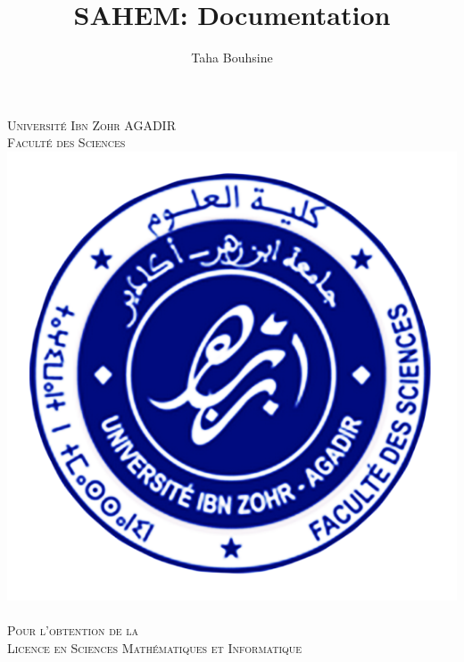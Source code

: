 \documentclass[11pt, openany]{report}
\begin{document}
\title{SAHEM: Documentation  }
\author{Taha Bouhsine}
\date{}


\thispagestyle{empty}
\renewcommand{\chaptermark}[1]{\markboth{\chaptername\ \thechapter. #1}{}}
\renewcommand{\sectionmark}[1]{\markright{\thesection. #1}}


\makeatletter
\def\figurename{{\protect\sc \protect\small\bfseries Fig.}}
\let\captionORI\caption
\def\caption#1{\captionORI{\rm\small #1}}
\makeatother


\begin{titlepage}
  \begin{sffamily}
  \begin{center}

    \textsc{\LARGE Université Ibn Zohr AGADIR\\
        Faculté des Sciences\\[1cm]
        }
    \includegraphics[scale=0.35]{assets/fsa.png}~\\[1cm]

    \textsc{ Pour l’obtention de la \\
    \Large Licence en Sciences Mathématiques et Informatique }\\[1.5cm]


\end{center}
\end{sffamily}
\end{titlepage}
\end{document}
